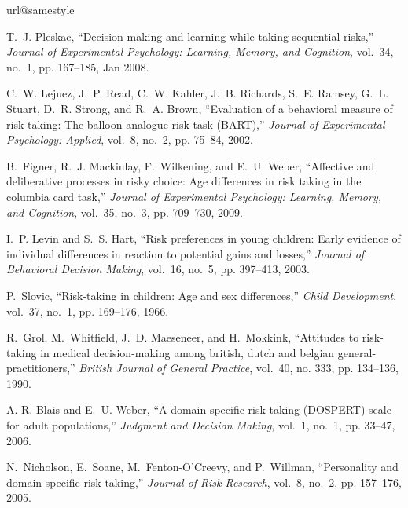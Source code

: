 \documentclass[conference]{IEEEtran}
\begin{document}

\begin{thebibliography}{1}
\providecommand{\url}[1]{#1} \csname url@samestyle\endcsname
\providecommand{\newblock}{\relax}
\providecommand{\bibinfo}[2]{#2}
\providecommand{\BIBentrySTDinterwordspacing}{\spaceskip=0pt\relax}
\providecommand{\BIBentryALTinterwordstretchfactor}{4}
\providecommand{\BIBentryALTinterwordspacing}{\spaceskip=\fontdimen2\font
plus \BIBentryALTinterwordstretchfactor\fontdimen3\font minus
  \fontdimen4\font\relax}
\providecommand{\BIBforeignlanguage}[2]{{\expandafter\ifx\csname l@#1\endcsname\relax
\typeout{** WARNING: IEEEtran.bst: No hyphenation pattern has been}\typeout{** loaded for the language `#1'. Using the pattern for}\typeout{** the default language instead.}\else \language=\csname l@#1\endcsname \fi #2}}
\providecommand{\BIBdecl}{\relax} \BIBdecl

T.~J. Pleskac, ``Decision making and learning while taking
sequential risks,''
  \emph{Journal of Experimental Psychology: Learning, Memory, and Cognition},
  vol.~34, no.~1, pp. 167--185, Jan 2008.

C.~W. Lejuez, J.~P. Read, C.~W. Kahler, J.~B. Richards, S.~E.
Ramsey, G.~L.
  Stuart, D.~R. Strong, and R.~A. Brown, ``Evaluation of a behavioral measure
  of risk-taking: The balloon analogue risk task ({B}{A}{R}{T)},''
  \emph{Journal of Experimental Psychology: Applied}, vol.~8, no.~2, pp.
  75--84, 2002.

B.~Figner, R.~J. Mackinlay, F.~Wilkening, and E.~U. Weber,
``Affective and
  deliberative processes in risky choice: Age differences in risk taking in the
  columbia card task,'' \emph{Journal of Experimental Psychology: Learning,
  Memory, and Cognition}, vol.~35, no.~3, pp. 709--730, 2009.

I.~P. Levin and S.~S. Hart, ``Risk preferences in young children:
Early
  evidence of individual differences in reaction to potential gains and
  losses,'' \emph{Journal of Behavioral Decision Making}, vol.~16, no.~5, pp.
  397--413, 2003.

P.~Slovic, ``Risk-taking in children: Age and sex differences,''
\emph{Child
  Development}, vol.~37, no.~1, pp. 169--176, 1966.

R.~Grol, M.~Whitfield, J.~D. Maeseneer, and H.~Mokkink,
``Attitudes to
  risk-taking in medical decision-making among british, dutch and belgian
  general-practitioners,'' \emph{British Journal of General Practice}, vol.~40,
  no. 333, pp. 134--136, 1990.

A.-R. Blais and E.~U. Weber, ``A domain-specific risk-taking
  ({D}{O}{S}{P}{E}{R}{T}) scale for adult populations,'' \emph{Judgment and
  Decision Making}, vol.~1, no.~1, pp. 33--47, 2006.

N.~Nicholson, E.~Soane, M.~Fenton-O'Creevy, and P.~Willman,
``Personality and
  domain-specific risk taking,'' \emph{Journal of Risk Research}, vol.~8,
  no.~2, pp. 157--176, 2005.

\end{thebibliography}
\end{document}
